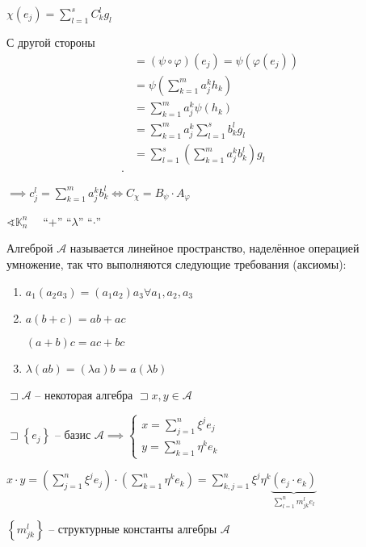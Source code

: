 \documentclass{book}
\theoremstyle{definition}
\begin{document}
$\chi\left( e_j \right) = \sum_{l=1}^{s} C^l_kg_l$ 

С другой стороны 
\begin{align*}  
 &= \left( \psi\circ \varphi \right) (e_j) = \psi\left( \varphi(e_j) \right) \\
 &= \psi\left( \sum_{k=1}^{m} a_j^kh_k \right)  \\
 &= \sum_{k=1}^{m} a_j^k\psi(h_k) \\
 &= \sum_{k=1}^{m} a^k_j \sum_{l=1}^{s} b_k^lg_l \\
 &= \sum_{l=1}^{s} \left( \sum_{k=1}^{m} a^k_jb^l_k \right) g_l \\
.\end{align*}

$\implies c^l_j = \sum_{k=1}^{m} a^k_jb^l_k \iff C_{\chi} = B_{\psi}\cdot A_{\varphi}$

$\sphericalangle \mathbb{K}^n_n\quad$ ``+'' ``$\lambda$'' ``$\cdot $''

\begin{definition}
    Алгеброй $\mathscr{A}$ называется линейное пространство, наделённое операцией умножение, так что выполняются следующие требования (аксиомы):
     \begin{enumerate}
         \item $a_1\left( a_2a_3 \right)  = (a_1a_2)a_3 \forall a_1, a_2, a_3$
         \item $a\left( b+c \right)  = ab+ac$
         
             $(a+b)c = ac+bc$
         \item  $\lambda\left( ab \right)  = \left( \lambda a \right) b = a\left( \lambda b \right) $
    \end{enumerate}
\end{definition}

$\sqsupset \mathscr{A}$ -- некоторая алгебра $\sqsupset x, y\in \mathscr{A}$

$\sqsupset \left\{ e_j \right\}$ -- базис $\mathscr{A} \implies \begin{cases}
    x = \sum_{j=1}^{n} \xi^je_j\\
    y = \sum_{k=1}^{n} \eta^ke_k
\end{cases}$ 

$x\cdot y = \left( \sum_{j=1}^{n} \xi^je_j \right) \cdot \left( \sum_{k=1}^{n} \eta^ke_k \right)  = \sum_{k,j = 1}^{n} \xi^j\eta^k\underbrace{\left( e_j\cdot e_k  \right)}_{\sum_{l=1}^{n} m^l_{jk}e_l } $

$\left\{ m^l_{jk} \right\}$ -- структурные константы алгебры $\mathscr{A}$
\end{document}
